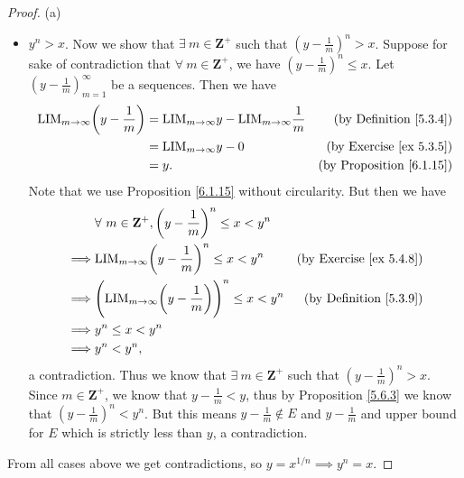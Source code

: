 \begin{proof}{(a)}
\begin{itemize}
              a contradiction.
              Thus we know that \(\exists\ m \in \mathbf{Z}^+\) such that \((y + \frac{1}{m})^n < x\).
              Since \(m \in \mathbf{Z}^+\), we know that \(y < y + \frac{1}{m}\), thus by Proposition \ref{5.6.3} we know that \(y^n < (y + \frac{1}{m})^n\).
              But this means \(y + \frac{1}{m} \in E\) and \(y + \frac{1}{m} \leq y\), a contradiction.
        \item \(y^n > x\).
              Now we show that \(\exists\ m \in \mathbf{Z}^+\) such that \((y - \frac{1}{m})^n > x\).
              Suppose for sake of contradiction that \(\forall\ m \in \mathbf{Z}^+\), we have \((y - \frac{1}{m})^n \leq x\).
              Let \((y - \frac{1}{m})_{m = 1}^\infty\) be a sequences.
              Then we have
              \begin{align*}
                  \text{LIM}_{m \to \infty} \bigg(y - \frac{1}{m}\bigg) & = \text{LIM}_{m \to \infty} y - \text{LIM}_{m \to \infty} \frac{1}{m} & \text{(by Definition \ref{5.3.4})}   \\
                                                                        & = \text{LIM}_{m \to \infty} y - 0                                     & \text{(by Exercise \ref{ex 5.3.5})}  \\
                                                                        & = y.                                                                  & \text{(by Proposition \ref{6.1.15})}
              \end{align*}
              Note that we use Proposition \ref{6.1.15} without circularity.
              But then we have
              \begin{align*}
                           & \forall\ m \in \mathbf{Z}^+, \bigg(y - \frac{1}{m}\bigg)^n \leq x < y^n                                                \\
                  \implies & \text{LIM}_{m \to \infty} \bigg(y - \frac{1}{m}\bigg)^n \leq x < y^n             & \text{(by Exercise \ref{ex 5.4.8})} \\
                  \implies & \Bigg(\text{LIM}_{m \to \infty} \bigg(y - \frac{1}{m}\bigg)\Bigg)^n \leq x < y^n & \text{(by Definition \ref{5.3.9})}  \\
                  \implies & y^n \leq x < y^n                                                                                                       \\
                  \implies & y^n < y^n,
              \end{align*}
              a contradiction.
              Thus we know that \(\exists\ m \in \mathbf{Z}^+\) such that \((y - \frac{1}{m})^n > x\).
              Since \(m \in \mathbf{Z}^+\), we know that \(y - \frac{1}{m} < y\), thus by Proposition \ref{5.6.3} we know that \((y - \frac{1}{m})^n < y^n\).
              But this means \(y - \frac{1}{m} \notin E\) and \(y - \frac{1}{m}\) and upper bound for \(E\) which is strictly less than \(y\), a contradiction.
    \end{itemize}
    From all cases above we get contradictions, so \(y = x^{1 / n} \implies y^n = x\).
\end{proof}

